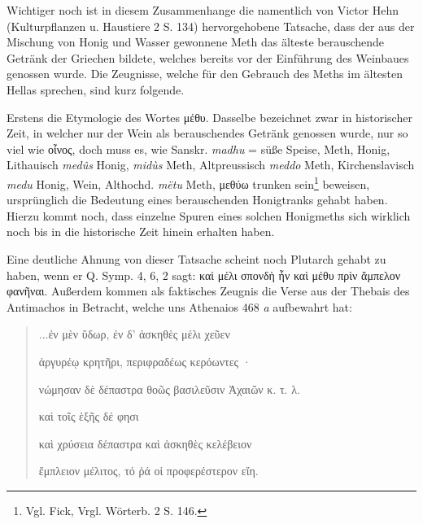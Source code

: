 \documentclass[a4paper, 11pt, oneside]{article}
\begin{document}
Wichtiger noch ist in diesem Zusammenhange die namentlich von Victor Hehn (Kulturpflanzen u. Haustiere 2 S. 134) hervorgehobene Tatsache, dass der aus der Mischung von Honig und Wasser gewonnene Meth das älteste berauschende Getränk der Griechen bildete, welches bereits vor der Einführung des Weinbaues genossen wurde. Die Zeugnisse, welche für den Gebrauch des Meths im ältesten Hellas sprechen, sind kurz folgende.

Erstens die Etymologie des Wortes μέθυ. Dasselbe bezeichnet zwar in historischer Zeit, in welcher nur der Wein als berauschendes Getränk genossen wurde, nur so viel wie οἶνος, doch muss es, wie Sanskr. \emph{madhu} = süße Speise, Meth, Honig, Lithauisch \emph{medûs} Honig, \emph{midùs} Meth, Altpreussisch \emph{meddo} Meth, Kirchenslavisch \emph{medu} Honig, Wein, Althochd. \emph{mëtu} Meth, μεθύω trunken sein\footnote{Vgl. Fick, Vrgl. Wörterb. 2 S. 146.} beweisen, ursprünglich die Bedeutung eines berauschenden Honigtranks gehabt haben. Hierzu kommt noch, dass einzelne Spuren eines solchen Honigmeths sich wirklich noch bis in die historische Zeit hinein erhalten haben.

Eine deutliche Ahnung von dieser Tatsache scheint noch Plutarch gehabt zu haben, wenn er Q. Symp. 4, 6, 2 sagt: καὶ μέλι σπονδὴ ἦν καὶ μέθυ πρὶν ἄμπελον φανῆναι. Außerdem kommen als faktisches Zeugnis die Verse aus der Thebais des Antimachos in Betracht, welche uns Athenaios 468 \emph{a} aufbewahrt hat:
\begin{quotation}
...ἐν μὲν ὕδωρ, ἐν δ' ἀσκηθὲς μέλι χεῦεν

ἀργυρέῳ κρητῆρι, περιφραδέως κερόωντες ·

νώμησαν δὲ δέπαστρα θοῶς βασιλεῦσιν Ἀχαιῶν κ. τ. λ.

\bigskip

\hspace*{15mm}καὶ τοῖς ἑξῆς δέ φησι

καὶ χρύσεια δέπαστρα καὶ ἀσκηθὲς κελέβειον

ἔμπλειον μέλιτος, τό ῥά οἱ προφερέστερον εἴη.
\end{quotation}
\end{document}
